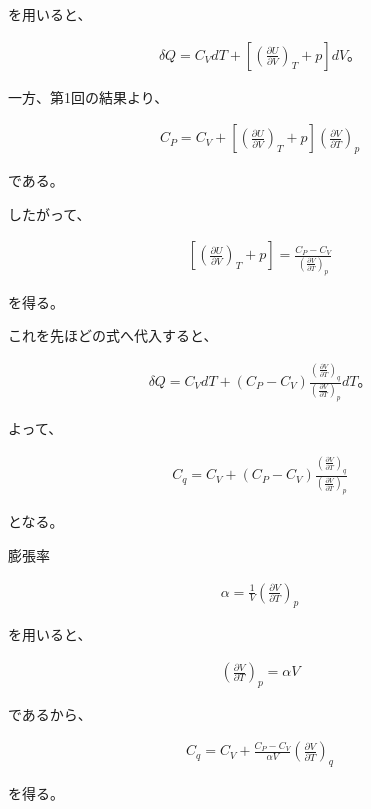 \documentclass[platex,dvipdfmx,a4paper]{jsarticle}
\begin{document}
を用いると、

\begin{align*}
\delta Q
=
C_V dT
+
\left[
\left(\frac{\partial U}{\partial V}\right)_T+p
\right]dV。
\end{align*}

一方、第1回の結果より、

\begin{align*}
C_P
=
C_V+
\left[
\left(\frac{\partial U}{\partial V}\right)_T+p
\right]
\left(\frac{\partial V}{\partial T}\right)_p
\end{align*}

である。

したがって、

\begin{align*}
\left[
\left(\frac{\partial U}{\partial V}\right)_T+p
\right]
=
\frac{C_P-C_V}
{\left(\frac{\partial V}{\partial T}\right)_p}
\end{align*}

を得る。

これを先ほどの式へ代入すると、

\begin{align*}
\delta Q
=
C_VdT
+
(C_P-C_V)
\frac{
\left(\frac{\partial V}{\partial T}\right)_q
}{
\left(\frac{\partial V}{\partial T}\right)_p
}
dT。
\end{align*}

よって、

\begin{align*}
C_q
=
C_V
+
(C_P-C_V)
\frac{
\left(\frac{\partial V}{\partial T}\right)_q
}{
\left(\frac{\partial V}{\partial T}\right)_p
}
\end{align*}

となる。

膨張率

\begin{align*}
\alpha
=
\frac1V
\left(\frac{\partial V}{\partial T}\right)_p
\end{align*}

を用いると、

\begin{align*}
\left(\frac{\partial V}{\partial T}\right)_p
=
\alpha V
\end{align*}

であるから、

\begin{align*}
C_q
=
C_V
+
\frac{C_P-C_V}
{\alpha V}
\left(\frac{\partial V}{\partial T}\right)_q
\end{align*}

を得る。
\end{document}
